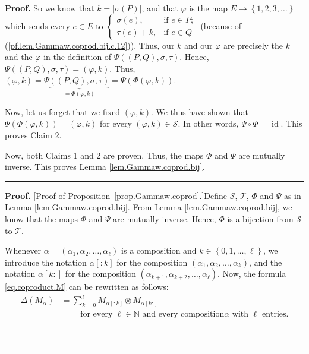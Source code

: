 \documentclass[numbers=enddot,12pt,final,onecolumn,notitlepage,abstracton]{scrartcl}
\theoremstyle{definition}
\newenvironment{proof}[1][Proof]{\noindent\textbf{#1.} }{\ \rule{0.5em}{0.5em}}
\let\sumnonlimits\sum
\renewcommand{\sum}{\sumnonlimits\limits}
\newenvironment{verlong}{}{}
\newcommand{\id}{{\operatorname{id}}}
\newcommand{\NN}{{\mathbb{N}}}
\begin{document}
\begin{verlong}
\begin{proof}
So we know that $k=\left\vert \sigma\left(  P\right)  \right\vert $, and that
$\varphi$ is the map $E\rightarrow\left\{  1,2,3,\ldots\right\}  $ which sends
every $e\in E$ to $%
\begin{cases}
\sigma\left(  e\right)  , & \text{if }e\in P;\\
\tau\left(  e\right)  +k, & \text{if }e\in Q
\end{cases}
$ (because of (\ref{pf.lem.Gammaw.coprod.bij.c.12})). Thus, our $k$ and our
$\varphi$ are precisely the $k$ and the $\varphi$ in the definition of
$\Psi\left(  \left(  P,Q\right)  ,\sigma,\tau\right)  $. Hence, $\Psi\left(
\left(  P,Q\right)  ,\sigma,\tau\right)  =\left(  \varphi,k\right)  $. Thus,
$\left(  \varphi,k\right)  =\Psi\underbrace{\left(  \left(  P,Q\right)
,\sigma,\tau\right)  }_{=\Phi\left(  \varphi,k\right)  }=\Psi\left(
\Phi\left(  \varphi,k\right)  \right)  $.

Now, let us forget that we fixed $\left(  \varphi,k\right)  $. We thus have
shown that $\Psi\left(  \Phi\left(  \varphi,k\right)  \right)  =\left(
\varphi,k\right)  $ for every $\left(  \varphi,k\right)  \in\mathcal{S}$. In
other words, $\Psi\circ\Phi=\id$. This proves Claim 2.

Now, both Claims 1 and 2 are proven. Thus, the maps $\Phi$ and $\Psi$ are
mutually inverse. This proves Lemma \ref{lem.Gammaw.coprod.bij}.
\end{proof}

\begin{proof}
[Proof of Proposition~\ref{prop.Gammaw.coprod}.]Define $\mathcal{S}$,
$\mathcal{T}$, $\Phi$ and $\Psi$ as in Lemma \ref{lem.Gammaw.coprod.bij}. From
Lemma \ref{lem.Gammaw.coprod.bij}, we know that the maps $\Phi$ and $\Psi$ are
mutually inverse. Hence, $\Phi$ is a bijection from $\mathcal{S}$ to
$\mathcal{T}$.

Whenever $\alpha=\left(  \alpha_{1},\alpha_{2},\ldots,\alpha_{\ell}\right)  $
is a composition and $k\in\left\{  0,1,\ldots,\ell\right\}  $, we introduce
the notation $\alpha\left[  :k\right]  $ for the composition $\left(
\alpha_{1},\alpha_{2},\ldots,\alpha_{k}\right)  $, and the notation
$\alpha\left[  k:\right]  $ for the composition $\left(  \alpha_{k+1}%
,\alpha_{k+2},\ldots,\alpha_{\ell}\right)  $. Now, the formula
\eqref{eq.coproduct.M} can be rewritten as follows:
\begin{align}
\Delta\left(  M_{\alpha}\right)   &  =\sum_{k=0}^{\ell}M_{\alpha\left[
:k\right]  }\otimes M_{\alpha\left[  k:\right]  }%
\label{pf.prop.Gammaw.coprod.long.DeltaM}\\
&  \qquad\text{ for every }\ell\in \NN \text{ and every composition
}\alpha\text{ with }\ell\text{ entries.}\nonumber
\end{align}



\end{proof}
\end{verlong}
\end{document}
